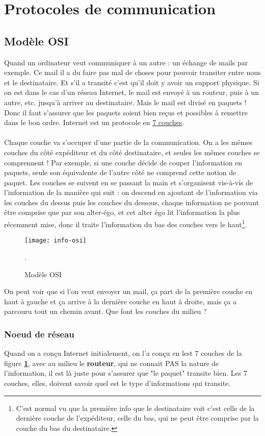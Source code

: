 \documentclass[12pt,a4paper]{report}
\begin{document}
\section{Protocoles de communication}
\subsection{Modèle OSI}
Quand un ordinateur veut communiquer à un autre : un échange de mails par exemple. Ce mail il a du faire pas mal de choses pour pouvoir transiter entre nous et le destinataire. Et s'il a transité c'est qu'il doit y avoir un support physique. Si on est dans le cas d'un réseau Internet, le mail est envoyé à un routeur, puis à un autre, etc. jusqu'à arriver au destinataire. Mais le mail est divisé en paquets ! Donc il faut s'assurer que les paquets soient bien reçus et possibles à remettre dans le bon ordre. Internet est un protocole en \underline{7 couches}.\\
\\
Chaque couche va s'occuper d'une partie de la communication. On a les mêmes couches du côté expéditeur et du côté destinataire, et seules les mêmes couches se comprennent ! Par exemple, si une couche décide de couper l'information en paquets, seule son équivalente de l'autre côté ne comprend cette notion de paquet. Les couches se suivent en se passant la main et s'organisent vis-à-vis de l'information de la manière qui suit : on descend en ajoutant de l'information via les couches du dessus puis les couches du dessous, chaque information ne pouvant être comprise que par son alter-égo, et cet alter égo lit l'information la plus récemment mise, donc il traite l'information du bas des couches vers le haut\footnote{C'est normal vu que la première info que le destinataire voit c'est celle de la dernière couche de l'expéditeur, celle du bas, qui ne peut être comprise par la couche du bas du destinataire.}.
\begin{figure}[h!]
\centering
\texttt{[image: info-osi]}
\caption{Modèle OSI}.
\label{fig:osi}
\end{figure}
On peut voir que si l'on veut envoyer un mail, ça part de la première couche en haut à gauche et ça arrive à la dernière couche en haut à droite, mais ça a parcouru tout un chemin avant. Que font les couches du milieu ?
\subsubsection{Noeud de réseau}
Quand on a conçu Internet initialement, on l'a conçu en lest 7 couches de la figure \textbf{\ref{fig:osi}}, avec au milieu le \textbf{routeur}, qui ne connait PAS la nature de l'information, il est là juste pour s'assurer que "le paquet" transite bien. Les 7 couches, elles, doivent savoir quel est le type d'informations qui transite.
\end{document}

